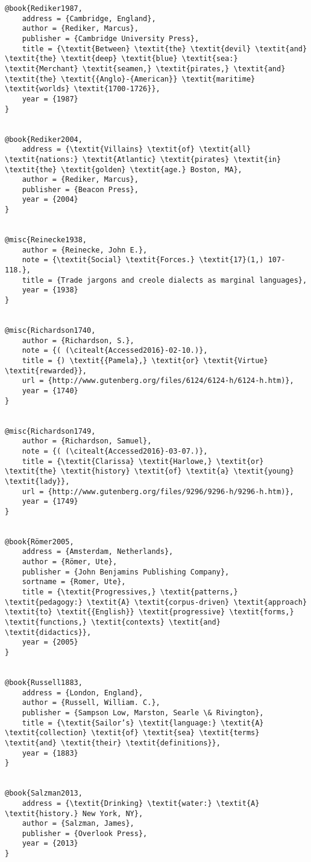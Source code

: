 \begin{verbatim}
@book{Rediker1987,
	address = {Cambridge, England},
	author = {Rediker, Marcus},
	publisher = {Cambridge University Press},
	title = {\textit{Between} \textit{the} \textit{devil} \textit{and} \textit{the} \textit{deep} \textit{blue} \textit{sea:} \textit{Merchant} \textit{seamen,} \textit{pirates,} \textit{and} \textit{the} \textit{{Anglo}-{American}} \textit{maritime} \textit{worlds} \textit{1700-1726}},
	year = {1987}
}


@book{Rediker2004,
	address = {\textit{Villains} \textit{of} \textit{all} \textit{nations:} \textit{Atlantic} \textit{pirates} \textit{in} \textit{the} \textit{golden} \textit{age.} Boston, MA},
	author = {Rediker, Marcus},
	publisher = {Beacon Press},
	year = {2004}
}


@misc{Reinecke1938,
	author = {Reinecke, John E.},
	note = {\textit{Social} \textit{Forces.} \textit{17}(1,) 107-118.},
	title = {Trade jargons and creole dialects as marginal languages},
	year = {1938}
}


@misc{Richardson1740,
	author = {Richardson, S.},
	note = {( (\citealt{Accessed2016}-02-10.)},
	title = {) \textit{{Pamela},} \textit{or} \textit{Virtue} \textit{rewarded}},
	url = {http://www.gutenberg.org/files/6124/6124-h/6124-h.htm)},
	year = {1740}
}


@misc{Richardson1749,
	author = {Richardson, Samuel},
	note = {( (\citealt{Accessed2016}-03-07.)},
	title = {\textit{Clarissa} \textit{Harlowe,} \textit{or} \textit{the} \textit{history} \textit{of} \textit{a} \textit{young} \textit{lady}},
	url = {http://www.gutenberg.org/files/9296/9296-h/9296-h.htm)},
	year = {1749}
}


@book{Römer2005,
	address = {Amsterdam, Netherlands},
	author = {Römer, Ute},
	publisher = {John Benjamins Publishing Company},
	sortname = {Romer, Ute},
	title = {\textit{Progressives,} \textit{patterns,} \textit{pedagogy:} \textit{A} \textit{corpus-driven} \textit{approach} \textit{to} \textit{{English}} \textit{progressive} \textit{forms,} \textit{functions,} \textit{contexts} \textit{and} \textit{didactics}},
	year = {2005}
}


@book{Russell1883,
	address = {London, England},
	author = {Russell, William. C.},
	publisher = {Sampson Low, Marston, Searle \& Rivington},
	title = {\textit{Sailor’s} \textit{language:} \textit{A} \textit{collection} \textit{of} \textit{sea} \textit{terms} \textit{and} \textit{their} \textit{definitions}},
	year = {1883}
}


@book{Salzman2013,
	address = {\textit{Drinking} \textit{water:} \textit{A} \textit{history.} New York, NY},
	author = {Salzman, James},
	publisher = {Overlook Press},
	year = {2013}
}



\end{verbatim}
